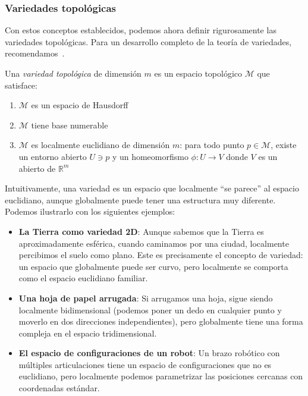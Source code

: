 \subsubsection{Variedades topológicas}\label{subsubsec:variedades_topologicas}

Con estos conceptos establecidos, podemos ahora definir rigurosamente las variedades topológicas. Para un desarrollo completo de la teoría de variedades, recomendamos~\citet{lee2012introduction}.

\begin{definition}\label{def:variedad_topologica}
Una \textit{variedad topológica} de dimensión $m$ es un espacio topológico $\mathcal{M}$ que satisface:
\begin{enumerate}
	\item $\mathcal{M}$ es un espacio de Hausdorff
	\item $\mathcal{M}$ tiene base numerable
	\item $\mathcal{M}$ es localmente euclidiano de dimensión $m$: para todo punto $p \in \mathcal{M}$, existe un entorno abierto $U \ni p$ y un homeomorfismo $\phi: U \to V$ donde $V$ es un abierto de $\mathbb{R}^m$
\end{enumerate}
\end{definition}

Intuitivamente, una variedad es un espacio que localmente ``se parece'' al espacio euclidiano, aunque globalmente puede tener una estructura muy diferente. Podemos ilustrarlo con los siguientes ejemplos:

\begin{itemize}
    \item \textbf{La Tierra como variedad 2D}: Aunque sabemos que la Tierra es aproximadamente esférica, cuando caminamos por una ciudad, localmente percibimos el suelo como plano. Este es precisamente el concepto de variedad: un espacio que globalmente puede ser curvo, pero localmente se comporta como el espacio euclidiano familiar.
    \item \textbf{Una hoja de papel arrugada}: Si arrugamos una hoja, sigue siendo localmente bidimensional (podemos poner un dedo en cualquier punto y moverlo en dos direcciones independientes), pero globalmente tiene una forma compleja en el espacio tridimensional.
    \item \textbf{El espacio de configuraciones de un robot}: Un brazo robótico con múltiples articulaciones tiene un espacio de configuraciones que no es euclidiano, pero localmente podemos parametrizar las posiciones cercanas con coordenadas estándar.
\end{itemize}

